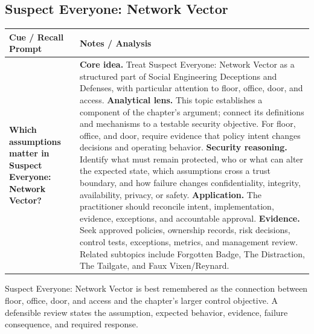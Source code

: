 \documentclass[11pt]{article}
\newcommand{\CornellHeader}{%
\rowcolor{Navy}\color{white}\bfseries Cue / Recall Prompt & \color{white}\bfseries Notes / Analysis\\\hline}
\newcommand{\CornellRow}[2]{%
\cellcolor{CueGray}\RaggedRight\textbf{#1} & \RaggedRight #2\\\hline}
\begin{document}
\subsection*{Suspect Everyone: Network Vector}
\begin{longtable}{>{\RaggedRight\arraybackslash}p{}|>{\RaggedRight\arraybackslash}p{}}
\CornellHeader
\CornellRow{Which assumptions matter in Suspect Everyone: Network Vector?}{\textbf{Core idea.} Treat Suspect Everyone: Network Vector as a structured part of Social Engineering Deceptions and Defenses, with particular attention to floor, office, door, and access. \textbf{Analytical lens.} This topic establishes a component of the chapter's argument; connect its definitions and mechanisms to a testable security objective. For floor, office, and door, require evidence that policy intent changes decisions and operating behavior. \textbf{Security reasoning.} Identify what must remain protected, who or what can alter the expected state, which assumptions cross a trust boundary, and how failure changes confidentiality, integrity, availability, privacy, or safety. \textbf{Application.} The practitioner should reconcile intent, implementation, evidence, exceptions, and accountable approval. \textbf{Evidence.} Seek approved policies, ownership records, risk decisions, control tests, exceptions, metrics, and management review. Related subtopics include Forgotten Badge, The Distraction, The Tailgate, and Faux Vixen/Reynard.}
\end{longtable}
\begin{topicsummary}
Suspect Everyone: Network Vector is best remembered as the connection between floor, office, door, and access and the chapter's larger control objective. A defensible review states the assumption, expected behavior, evidence, failure consequence, and required response.
\end{topicsummary}
\end{document}
